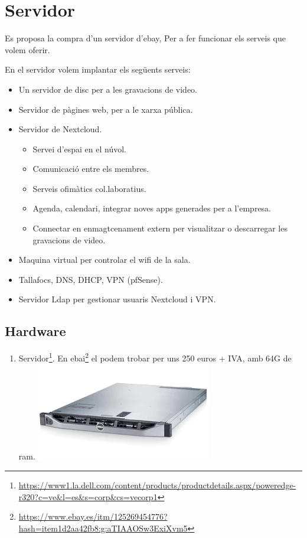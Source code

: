 \documentclass[
  10pt,
]{krantz}
\DeclareRobustCommand{\href}[2]{#2\footnote{\url{#1}}}
\providecommand{\tightlist}{%
  \setlength{\itemsep}{0pt}\setlength{\parskip}{0pt}}
\begin{document}
\hypertarget{servidor-2}{%
\chapter{Servidor}\label{servidor-2}}

Es proposa la compra d'un servidor d'ebay, Per a fer funcionar els serveis que volem oferir.

En el servidor volem implantar els següents serveis:

\begin{itemize}
\item
  Un servidor de disc per a les gravacions de video.
\item
  Servidor de pàgines web, per a le xarxa pública.
\item
  Servidor de Nextcloud.

  \begin{itemize}
  \tightlist
  \item
    Servei d'espai en el núvol.
  \item
    Comunicació entre els membres.
  \item
    Serveis ofimàtics col.laboratius.
  \item
    Agenda, calendari, integrar noves apps generades per a l'empresa.
  \item
    Connectar en enmagtcenament extern per visualitzar o descarregar les gravacions de video.
  \end{itemize}
\item
  Maquina virtual per controlar el wifi de la sala.
\item
  Tallafocs, DNS, DHCP, VPN (pfSense).
\item
  Servidor Ldap per gestionar usuaris Nextcloud i VPN.
\end{itemize}

\hypertarget{hardware}{%
\section{Hardware}\label{hardware}}

\begin{enumerate}
\def\labelenumi{\arabic{enumi}.}
\tightlist
\item
  \href{https://www1.la.dell.com/content/products/productdetails.aspx/poweredge-r320?c=ve\&l=es\&s=corp\&cs=vecorp1}{Servidor}. En \href{https://www.ebay.es/itm/125269454776?hash=item1d2aa42fb8:g:aTIAAOSw3ExiXvm5}{ebai} el podem trobar per uns 250 euros + IVA, amb 64G de ram. \includegraphics{imatges/serverR320.png}
\end{enumerate}
\end{document}
